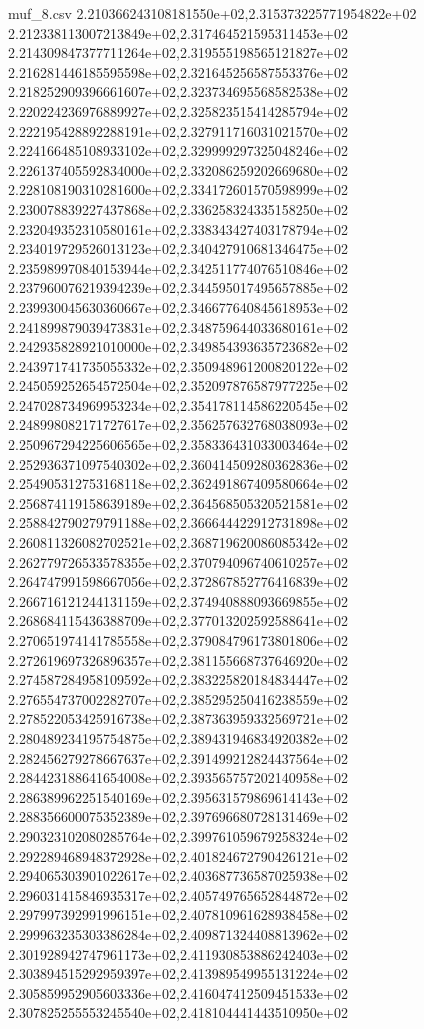 \begin{filecontents*}{muf_8.csv}
2.210366243108181550e+02,2.315373225771954822e+02
2.212338113007213849e+02,2.317464521595311453e+02
2.214309847377711264e+02,2.319555198565121827e+02
2.216281446185595598e+02,2.321645256587553376e+02
2.218252909396661607e+02,2.323734695568582538e+02
2.220224236976889927e+02,2.325823515414285794e+02
2.222195428892288191e+02,2.327911716031021570e+02
2.224166485108933102e+02,2.329999297325048246e+02
2.226137405592834000e+02,2.332086259202669680e+02
2.228108190310281600e+02,2.334172601570598999e+02
2.230078839227437868e+02,2.336258324335158250e+02
2.232049352310580161e+02,2.338343427403178794e+02
2.234019729526013123e+02,2.340427910681346475e+02
2.235989970840153944e+02,2.342511774076510846e+02
2.237960076219394239e+02,2.344595017495657885e+02
2.239930045630360667e+02,2.346677640845618953e+02
2.241899879039473831e+02,2.348759644033680161e+02
2.242935828921010000e+02,2.349854393635723682e+02
2.243971741735055332e+02,2.350948961200820122e+02
2.245059252654572504e+02,2.352097876587977225e+02
2.247028734969953234e+02,2.354178114586220545e+02
2.248998082171727617e+02,2.356257632768038093e+02
2.250967294225606565e+02,2.358336431033003464e+02
2.252936371097540302e+02,2.360414509280362836e+02
2.254905312753168118e+02,2.362491867409580664e+02
2.256874119158639189e+02,2.364568505320521581e+02
2.258842790279791188e+02,2.366644422912731898e+02
2.260811326082702521e+02,2.368719620086085342e+02
2.262779726533578355e+02,2.370794096740610257e+02
2.264747991598667056e+02,2.372867852776416839e+02
2.266716121244131159e+02,2.374940888093669855e+02
2.268684115436388709e+02,2.377013202592588641e+02
2.270651974141785558e+02,2.379084796173801806e+02
2.272619697326896357e+02,2.381155668737646920e+02
2.274587284958109592e+02,2.383225820184834447e+02
2.276554737002282707e+02,2.385295250416238559e+02
2.278522053425916738e+02,2.387363959332569721e+02
2.280489234195754875e+02,2.389431946834920382e+02
2.282456279278667637e+02,2.391499212824437564e+02
2.284423188641654008e+02,2.393565757202140958e+02
2.286389962251540169e+02,2.395631579869614143e+02
2.288356600075352389e+02,2.397696680728131469e+02
2.290323102080285764e+02,2.399761059679258324e+02
2.292289468948372928e+02,2.401824672790426121e+02
2.294065303901022617e+02,2.403687736587025938e+02
2.296031415846935317e+02,2.405749765652844872e+02
2.297997392991996151e+02,2.407810961628938458e+02
2.299963235303386284e+02,2.409871324408813962e+02
2.301928942747961173e+02,2.411930853886242403e+02
2.303894515292959397e+02,2.413989549955131224e+02
2.305859952905603336e+02,2.416047412509451533e+02
2.307825255553245540e+02,2.418104441443510950e+02

\end{filecontents*}
